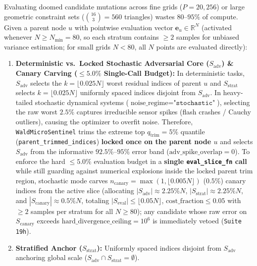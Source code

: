 \documentclass[11pt,a4paper]{article}
\begin{document}
Evaluating doomed candidate mutations across fine grids ($P = 20,256$) or large geometric constraint sets ($\binom{16}{3} = 560$ triangles) wastes $80\text{--}95\%$ of compute. Given a parent node $u$ with pointwise evaluation vector $\mathbf{e}_u \in \mathbb{R}^N$ (activated whenever $N \ge N_{\min} = 80$, so each stratum contains $\ge 2$ samples for unbiased variance estimation; for small grids $N < 80$, all $N$ points are evaluated directly):
\begin{enumerate}
\item \textbf{Deterministic vs.\ Locked Stochastic Adversarial Core ($S_{\text{adv}}$) \& Canary Carving ($\le 5.0\%$ Single-Call Budget):} In deterministic tasks, $S_{\text{adv}}$ selects the $k = \lfloor 0.025 N \rfloor$ worst residual indices of parent $u$ and $S_{\text{strat}}$ selects $k = \lfloor 0.025 N \rfloor$ uniformly spaced indices disjoint from $S_{\text{adv}}$. In heavy-tailed stochastic dynamical systems ($\text{noise\_regime}=\texttt{"stochastic"}$), selecting the raw worst $2.5\%$ captures irreducible sensor spikes (flash crashes / Cauchy outliers), causing the optimizer to overfit noise. Therefore, \texttt{WaldMicroSentinel} trims the extreme top $q_{\text{trim}} = 5\%$ quantile (\texttt{parent\_trimmed\_indices}) \textbf{locked once on the parent node $u$} and selects $S_{\text{adv}}$ from the informative $92.5\%\text{--}95\%$ error band ($\text{adv\_spike\_overlap} = 0$). To enforce the hard $\le 5.0\%$ evaluation budget in a \textbf{single \texttt{eval\_slice\_fn} call} while still guarding against numerical explosions inside the locked parent trim region, stochastic mode carves $n_{\text{canary}} = \max(1, \lfloor 0.005 N \rfloor)$ ($0.5\%$) canary indices from the active slice (allocating $|S_{\text{adv}}| \approx 2.25\% N$, $|S_{\text{strat}}| \approx 2.25\% N$, and $|S_{\text{canary}}| \approx 0.5\% N$, totaling $|S_{\text{eval}}| \le \lfloor 0.05 N \rfloor$, $\text{cost\_fraction} \le 0.05$ with $\ge 2$ samples per stratum for all $N \ge 80$); any candidate whose raw error on $S_{\text{canary}}$ exceeds $\text{hard\_divergence\_ceiling} = 10^6$ is immediately vetoed (\texttt{Suite 19h}).
\item \textbf{Stratified Anchor ($S_{\text{strat}}$):} Uniformly spaced indices disjoint from $S_{\text{adv}}$ anchoring global scale ($S_{\text{adv}} \cap S_{\text{strat}} = \emptyset$).

\end{enumerate}
\end{document}
